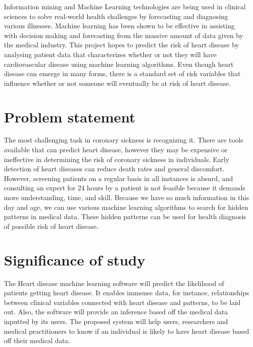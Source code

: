 Information mining and Machine Learning technologies are being used in clinical sciences to solve real-world health challenges by forecasting and diagnosing various illnesses.
Machine learning has been shown to be effective in assisting with decision making and forecasting from the massive amount of data given by the medical industry. This project hopes to predict the risk of heart disease by analysing patient data that characterizes whether or not they will have cardiovascular disease using machine learning algorithms. Even though heart disease can emerge in many forms, there is a standard set of risk variables that influence whether or not someone will eventually be at risk of heart disease. 


\section{Problem statement}
The most challenging task in coronary sickness is recognizing it. There are tools available that can predict heart disease, however they may be expensive or ineffective in determining the risk of coronary sickness in individuals. Early detection of heart diseases can reduce death rates and general discomfort. However, screening patients on a regular basis in all instances is absurd, and consulting an expert for 24 hours by a patient is not feasible because it demands more understanding, time, and skill. Because we have so much information in this day and age, we can use various machine learning algorithms to search for hidden patterns in medical data. These hidden patterns can be used for health diagnosis of possible risk of heart disease.

\section{Significance of study}
The Heart disease machine learning software will predict the likelihood of patients getting heart disease. It enables immense data, for instance, relationships between clinical variables connected with heart disease and patterns, to be laid out. Also, the software will provide an inference based off the medical data inputted by its users. The proposed system will help users, researchers and medical practitioners to know if an individual is likely to have heart disease based off their medical data.

